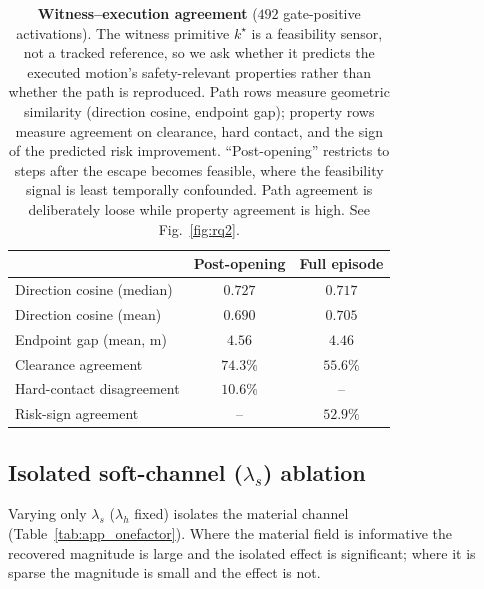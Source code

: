 \begin{table}[htbp]
\centering
\caption{\textbf{Witness--execution agreement} ($492$ gate-positive
activations). The witness primitive $k^\star$ is a feasibility sensor, not a
tracked reference, so we ask whether it predicts the executed motion's
safety-relevant properties rather than whether the path is reproduced. Path
rows measure geometric similarity (direction cosine, endpoint gap); property
rows measure agreement on clearance, hard contact, and the sign of the
predicted risk improvement. ``Post-opening'' restricts to steps after the
escape becomes feasible, where the feasibility signal is least temporally
confounded. Path agreement is deliberately loose while property agreement is
high. See Fig.~\ref{fig:rq2}.}
\label{tab:app_witness}
\small\setlength{\tabcolsep}{8pt}\renewcommand{\arraystretch}{1.1}
\begin{tabular}{lcc}
\toprule
 & Post-opening & Full episode \\
\midrule
Direction cosine (median) & $0.727$ & $0.717$ \\
Direction cosine (mean)   & $0.690$ & $0.705$ \\
Endpoint gap (mean, m)    & $4.56$  & $4.46$  \\
Clearance agreement       & $74.3\%$ & $55.6\%$ \\
Hard-contact disagreement & $10.6\%$ & -- \\
Risk-sign agreement       & -- & $52.9\%$ \\
\bottomrule
\end{tabular}
\end{table}

\subsection{Isolated soft-channel ($\lambda_s$) ablation}
\label{app:onefactor}
Varying only $\lambda_s$ ($\lambda_h$ fixed) isolates the material channel
(Table~\ref{tab:app_onefactor}). Where the material field is informative the
recovered magnitude is large and the isolated effect is significant; where it is
sparse the magnitude is small and the effect is not.

